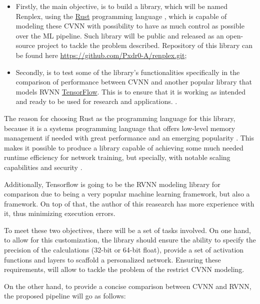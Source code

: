 \begin{itemize}
	\item Firstly, the main objective, is to build a library, which will be named Renplex, using the \href{https://www.rust-lang.org/}{Rust} programming language \parencite{rust2018}, which is capable of modeling these \gls{CVNN} with possibility to have as much control as possible over the ML pipeline. Such library will be public and released as an open-source project to tackle the problem described. Repository of this library can be found here \href{https://github.com/Pxdr0-A/renplex.git}{https://github.com/Pxdr0-A/renplex.git};
	\item Secondly, is to test some of the library's functionalities specifically in the comparison of performance between \gls{CVNN} and another popular library that models \gls{RVNN} \href{https://www.tensorflow.org/}{TensorFlow}. This is to ensure that it is working as intended and ready to be used for research and applications. \parencite{tensorflow2023}.  
\end{itemize}

The reason for choosing Rust as the programming language for this library, because it is a systems programming language that offers low-level memory management if needed with great performance and an emerging popularity \parencite{stackoverflow2023}. This makes it possible to produce a library capable of achieving some much needed runtime efficiency for network training, but specially, with notable scaling capabilities and security \parencite{rust2018}.

Additionally, Tensorflow is going to be the \gls{RVNN} modeling library for comparison due to being a very popular machine learning framework, but also a framework. On top of that, the author of this reasearch has more experience with it, thus minimizing execution errors. 

To meet these two objectives, there will be a set of tasks involved. On one hand, to allow for this customization, the library should ensure the ability to specify the precision of the calculations (32-bit or 64-bit float), provide a set of activation functions and layers to scaffold a personalized network. Ensuring these requirements, will allow to tackle the problem of the restrict \gls{CVNN} modeling.

On the other hand, to provide a concise comparison between \gls{CVNN} and \gls{RVNN}, the proposed pipeline will go as follows:

